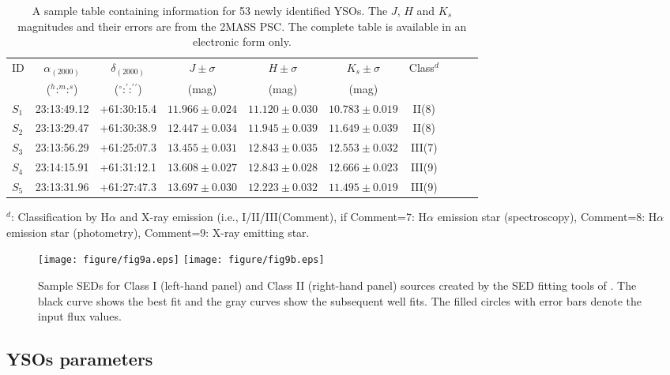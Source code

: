 \documentclass[a4paper,fleqn,usenatbib,useAMS]{mnras}
\begin{document}
\begin{table*}
\caption{\label{data2_yso} A sample table containing information for 53 newly identified YSOs. The $J$, $H$ and $K_s$ magnitudes and their errors are from the 2MASS PSC. The complete table is available in an electronic form only.}
\begin{tabular}{@{}lccccccccc@{}}
\hline  
ID& $\alpha_{(2000)}$  & $\delta_{(2000)}$ & $J\pm \sigma$  & $H\pm \sigma$  &  $K_s\pm \sigma$ & Class$^d$\\
 & ($^h$:$^m$:$^s$)  &  ($^\circ$:$^\prime$:$^\prime$$^\prime$)                & (mag)& (mag)& (mag)&\\
\hline  
$S_1$  &  23:13:49.12 &+61:30:15.4&$11.966\pm0.024$&$11.120\pm0.030$&$10.783\pm0.019$& II(8) \\
$S_2$  &  23:13:29.47 &+61:30:38.9&$12.447\pm0.034$&$11.945\pm0.039$&$11.649\pm0.039$& II(8) \\
$S_3$  &  23:13:56.29 &+61:25:07.3&$13.455\pm0.031$&$12.843\pm0.035$&$12.553\pm0.032$& III(7) \\
$S_4$  &  23:14:15.91 &+61:31:12.1&$13.608\pm0.027$&$12.843\pm0.028$&$12.666\pm0.023$& III(9)  \\
$S_5$  &  23:13:31.96 &+61:27:47.3&$13.697\pm0.030$&$12.223\pm0.032$&$11.495\pm0.019$& III(9)  \\
\hline
\end{tabular}

$^d$: Classification by H$\alpha$ and X-ray emission (i.e., I/II/III(Comment), if Comment=7: H$\alpha$ emission star (spectroscopy), Comment=8: H$\alpha$ emission star (photometry), Comment=9: X-ray emitting star.\\
\end{table*}



\begin{figure*}
\centering\texttt{[image: figure/fig9a.eps]}
\centering\texttt{[image: figure/fig9b.eps]}
\caption{\label{sed} Sample SEDs for Class I (left-hand panel) and Class II (right-hand panel)  sources 
created by the SED fitting tools of \citet{2007ApJS..169..328R}. 
The black curve shows the best fit and the gray curves show the subsequent well fits. 
The filled circles with error bars denote the input flux values.}
\end{figure*}



\subsection{YSOs parameters }
\end{document}
